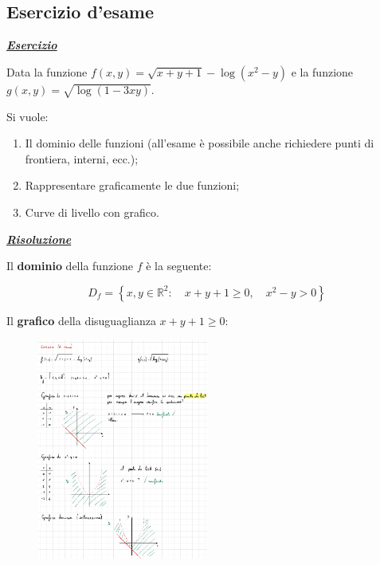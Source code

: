 \documentclass[a4paper]{article}
\begin{document}
	\newpage
	
	\subsection{Esercizio d'\textcolor{Red3}{esame}}
	
	\textcolor{Red3}{\textbf{\underline{\emph{Esercizio}}}}\newline
	
	\noindent
	Data la funzione $f\left(x,y\right) = \sqrt{x + y + 1} - \log\left(x^{2} - y\right)$ e la funzione $g\left(x,y\right) = \sqrt{\log\left(1-3xy\right)}$.
	
	\noindent
	Si vuole:
	
	\begin{enumerate}
		\item Il dominio delle funzioni (all'esame è possibile anche richiedere punti di frontiera, interni, ecc.);
		
		\item Rappresentare graficamente le due funzioni;
		
		\item Curve di livello con grafico.
	\end{enumerate}

	\noindent
	\textcolor{Green4}{\textbf{\underline{\emph{Risoluzione}}}}\newline
	
	\noindent
	Il \textbf{dominio} della funzione $f$ è la seguente:
	
	\begin{equation*}
		D_{f} = \left\{x,y \in \mathbb{R}^{2} : \hspace{1em} x+y+1 \ge 0, \hspace{1em} x^{2}-y > 0\right\}
	\end{equation*}

	\noindent
	Il \textbf{grafico} della disuguaglianza $x+y+1 \ge 0$:
	
	\begin{figure}[!htp]
		\centering
		\includegraphics[width=0.5\textwidth]{img/ex1_esame.pdf}
	\end{figure}
\end{document}

